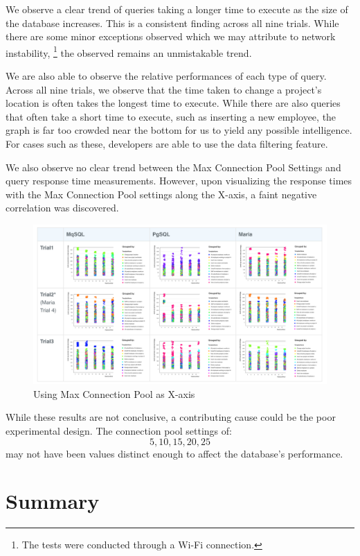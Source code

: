 \documentclass[12pt]{report}
\begin{document}
\begin{spacing}{1.9}
	We observe a clear trend of queries taking a longer time to execute as the size of the database increases. This is a consistent finding across all nine trials. While there are some minor exceptions observed which we may attribute to network instability, \footnote{The tests were conducted through a Wi-Fi connection.} the observed remains an unmistakable trend.
	
	We are also able to observe the relative performances of each type of query. Across all nine trials, we observe that the time taken to change a project's location is often takes the longest time to execute. While there are also queries that often take a short time to execute, such as inserting a new employee, the graph is far too crowded near the bottom for us to yield any possible intelligence. For cases such as these, developers are able to use the data filtering feature.
	
	We also observe no clear trend between the Max Connection Pool Settings and query response time measurements. However, upon visualizing the response times with the Max Connection Pool settings along the X-axis, a faint negative correlation was discovered.
	
	\begin{figure}[H]
		\centering
		\includegraphics[width=\textwidth]{MCP.png}
		\caption{Using Max Connection Pool as X-axis}
		
	\end{figure}
	
	While these results are not conclusive, a contributing cause could be the poor experimental design. The connection pool settings of: \[5,10,15,20,25\] may not have been values distinct enough to affect the database's performance.
	
	\clearpage
	\chapter{Summary}
	

\end{spacing}
\end{document}

